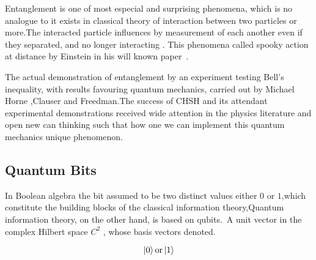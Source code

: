 
Entanglement is one of most especial and surprising phenomena, which is no analogue to it exists in classical theory of  interaction between two particles or more\citep{PhysRevLett.78.5022}.The interacted particle influences by measurement of each another even if they separated,  and no longer interacting . This phenomena  called spooky action at distance by Einstein in his will known paper~\cite{EPR}.


The actual demonstration of entanglement by an experiment testing Bell’s inequality, with results favouring quantum mechanics, carried out by Michael Horne ,Clauser and Freedman\citep{PhysRevLett.23.880}.The success of CHSH and its attendant experimental demonstrations received wide attention in the physics literature and open new can thinking such that how one we can implement this quantum mechanics unique phenomenon.
\subsection{Quantum Bits}

In Boolean algebra the bit assumed to be  two distinct values either $0 $ or $1$,which constitute the building blocks of the classical information theory,Quantum information theory, on the other hand, is based on qubits.\citep{nielsen2002quantum}~A unit vector in the  complex Hilbert space $C^2$ , whose basis vectors denoted.

\begin{equation}
\ket{0}\text{or}\ket{1}
\end{equation}

